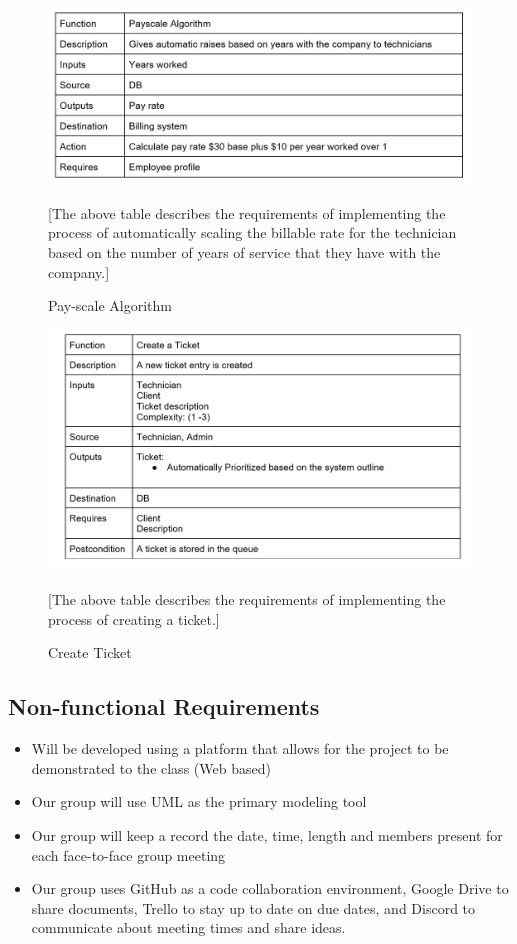 \documentclass[letterpaper]{article}
\begin{document}
\begin{figure}[htbp]
  \includegraphics[scale = .5]{PayscaleAlg}
  \caption{Pay-scale Algorithm}[The above table describes the requirements of implementing the process of automatically scaling the billable rate for the technician based on the number of years of service that they have with the company.]
  \centering
\end{figure}

\begin{figure}[htbp]
  \includegraphics[scale = .5]{MakeTicket}
  \caption{Create Ticket}[The above table describes the requirements of implementing the process of creating a ticket.]
  \centering
\end{figure}

\pagebreak

\subsection{Non-functional Requirements}
\begin{itemize}
  \item  Will be developed using a platform that allows for the project to be demonstrated to the class (Web based)
  \item Our group will use UML as the primary modeling tool
  \item Our group will keep a record the date, time, length and members present for each face-to-face group meeting
  \item Our group uses GitHub as a code collaboration environment, Google Drive to share documents, Trello to stay up to date on due dates, and Discord to communicate about meeting times and share ideas. 
\end{itemize}
\end{document}
